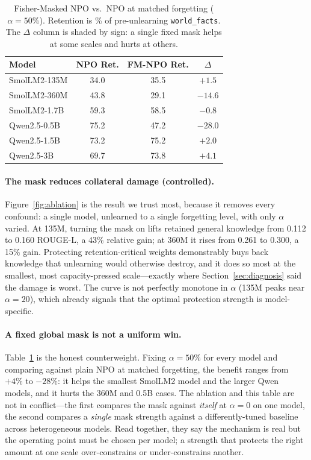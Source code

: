 \documentclass[sigconf,nonacm]{acmart}
\begin{document}
\begin{table}[t]
\centering
\caption{Fisher-Masked NPO vs.\ NPO at matched forgetting ($\alpha{=}50\%$). Retention is \% of pre-unlearning \texttt{world\_facts}. The $\Delta$ column is shaded by sign: a single fixed mask helps at some scales and hurts at others.}
\label{tab:fmvsnpo}
\small
\begin{tabular}{lccc}
\toprule
\rowcolor{hiA} \textbf{Model} & \textbf{NPO Ret.} & \textbf{FM-NPO Ret.} & \textbf{$\Delta$} \\
\midrule
SmolLM2-135M & 34.0 & 35.5 & \cellcolor{good!18}$+1.5$ \\
\rowcolor{hiB} SmolLM2-360M & 43.8 & 29.1 & \cellcolor{lock!20}$-14.6$ \\
SmolLM2-1.7B & 59.3 & 58.5 & \cellcolor{lock!8}$-0.8$ \\
\rowcolor{hiB} Qwen2.5-0.5B & 75.2 & 47.2 & \cellcolor{lock!28}$-28.0$ \\
Qwen2.5-1.5B & 73.2 & 75.2 & \cellcolor{good!18}$+2.0$ \\
\rowcolor{hiB} Qwen2.5-3B   & 69.7 & 73.8 & \cellcolor{good!26}$+4.1$ \\
\bottomrule
\end{tabular}
\end{table}

\paragraph{The mask reduces collateral damage (controlled).} Figure~\ref{fig:ablation} is the result we trust most, because it removes every confound: a single model, unlearned to a single forgetting level, with only $\alpha$ varied. At 135M, turning the mask on lifts retained general knowledge from 0.112 to 0.160 ROUGE-L, a 43\% relative gain; at 360M it rises from 0.261 to 0.300, a 15\% gain. Protecting retention-critical weights demonstrably buys back knowledge that unlearning would otherwise destroy, and it does so most at the smallest, most capacity-pressed scale---exactly where Section~\ref{sec:diagnosis} said the damage is worst. The curve is not perfectly monotone in $\alpha$ (135M peaks near $\alpha{=}20$), which already signals that the optimal protection strength is model-specific.

\paragraph{A fixed global mask is not a uniform win.} Table~\ref{tab:fmvsnpo} is the honest counterweight. Fixing $\alpha{=}50\%$ for every model and comparing against plain NPO at matched forgetting, the benefit ranges from $+4\%$ to $-28\%$: it helps the smallest SmolLM2 model and the larger Qwen models, and it hurts the 360M and 0.5B cases. The ablation and this table are not in conflict---the first compares the mask against \emph{itself} at $\alpha{=}0$ on one model, the second compares a \emph{single} mask strength against a differently-tuned baseline across heterogeneous models. Read together, they say the mechanism is real but the operating point must be chosen per model; a strength that protects the right amount at one scale over-constrains or under-constrains another.
\end{document}
